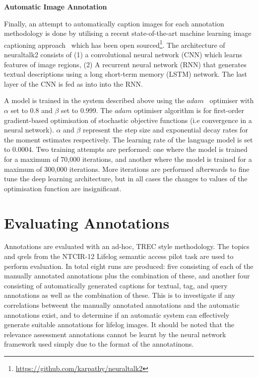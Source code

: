 \newpage
\textbf{Automatic Image Annotation}

Finally, an attempt to automatically caption images for each annotation methodology is done by utilising a recent state-of-the-art machine learning image captioning approach~\cite{karpathy2015deep} which has been open sourced\footnote{\url{https://github.com/karpathy/neuraltalk2}}. The architecture of neuraltalk2 consists of (1) a convolutional neural network (CNN) which learns features of image regions, (2) A recurrent neural network (RNN) that generates textual descriptions using a long short-term memory (LSTM) network. The last layer of the CNN is fed as into into the RNN.

A model is trained in the system described above using the $adam$~\cite{kingma2014adam} optimiser with $\alpha$ set to 0.8 and $\beta$ set to 0.999. The $adam$ optimiser algorithm is for first-order gradient-based optimisation of stochastic objective functions (i.e convergence in a neural network). $\alpha$ and $\beta$ represent the step size and exponential decay rates for the moment estimates respectively. The learning rate of the language model is set to 0.0004. Two training attempts are performed: one where the model is trained for a maximum of 70,000 iterations, and another where the model is trained for a maximum of 300,000 iterations. More iterations are performed afterwards to fine tune the deep learning architecture, but in all cases the changes to values of the optimisation function are insignificant.

\section{Evaluating Annotations}\label{methods:evaluating}

Annotations are evaluated with an ad-hoc, TREC style methodology. The topics and qrels from the NTCIR-12 Lifelog semantic access pilot task are used to perform evaluation. In total eight runs are produced: five consisting of each of the manually annotated annotations plus the combination of these, and another four consisting of automatically generated captions for textual, tag, and query annotations as well as the combination of these. This is to investigate if any correlations betweent the manually annotated annotations and the automatic annotations exist, and to determine if an automatic system can effectively generate suitable annotations for lifelog images. It should be noted that the relevance assessment annotations cannot be learnt by the neural network framework used simply due to the format of the annotatinons.

